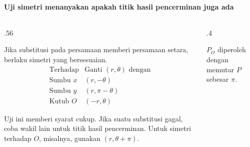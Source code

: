 \documentclass{../../kalkulus-ppt}
\newcommand{\sumbubidang}[4]{%
    \draw[sumbu] (#1,0) -- (#2,0) node[right,font=\scriptsize] {$x$};
    \draw[sumbu] (0,#3) -- (0,#4) node[above,font=\scriptsize] {$y$};
}
\begin{document}
\begin{frame}{\insertsection}
    \framesubtitle{Uji simetri menanyakan apakah titik hasil pencerminan juga ada}
    \begin{columns}[c,onlytextwidth]
        \begin{column}{.56\textwidth}
            \begin{teorema}
                Jika substitusi pada persamaan memberi persamaan
                setara, berlaku simetri yang bersesuaian.
                \[
                    \begin{array}{l|l}
                        \text{Terhadap} & \text{Ganti }(r,\theta)\text{ dengan}\\ \hline
                        \text{Sumbu }x & (r,-\theta)\\
                        \text{Sumbu }y & (r,\pi-\theta)\\
                        \text{Kutub }O & (-r,\theta)
                    \end{array}
                \]
            \end{teorema}
            Uji ini memberi syarat cukup. Jika suatu substitusi
            gagal, coba wakil lain untuk titik hasil pencerminan.
            Untuk simetri terhadap $O$, misalnya, gunakan
            $(r,\theta+\pi)$.
        \end{column}
        \begin{column}{.4\textwidth}
            \centering
            \par
            \small $P_O$ diperoleh dengan memutar $P$ sebesar $\pi$.
        \end{column}
    \end{columns}
\end{frame}
\end{document}
